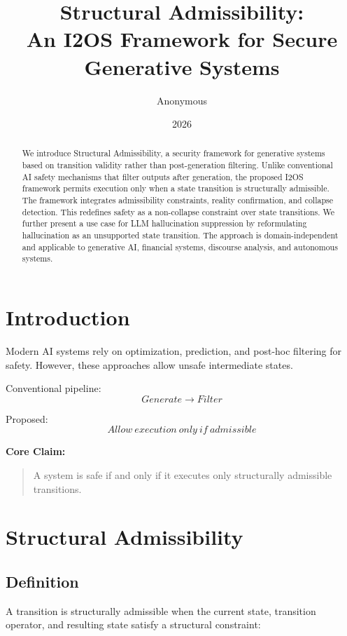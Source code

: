 \documentclass[11pt]{article}
\title{Structural Admissibility:\\
An I2OS Framework for Secure Generative Systems}
\author{Anonymous}
\date{2026}
\begin{document}
\maketitle

\begin{abstract}
We introduce Structural Admissibility, a security framework for generative systems based on transition validity rather than post-generation filtering. Unlike conventional AI safety mechanisms that filter outputs after generation, the proposed I2OS framework permits execution only when a state transition is structurally admissible. The framework integrates admissibility constraints, reality confirmation, and collapse detection. This redefines safety as a non-collapse constraint over state transitions. We further present a use case for LLM hallucination suppression by reformulating hallucination as an unsupported state transition. The approach is domain-independent and applicable to generative AI, financial systems, discourse analysis, and autonomous systems.
\end{abstract}

\section{Introduction}

Modern AI systems rely on optimization, prediction, and post-hoc filtering for safety. However, these approaches allow unsafe intermediate states.

Conventional pipeline:
\[
Generate \rightarrow Filter
\]

Proposed:
\[
Allow\ execution\ only\ if\ admissible
\]

\textbf{Core Claim:}
\begin{quote}
A system is safe if and only if it executes only structurally admissible transitions.
\end{quote}

\section{Structural Admissibility}

\subsection{Definition}

A transition is structurally admissible when the current state, transition operator, and resulting state satisfy a structural constraint:
\end{document}
